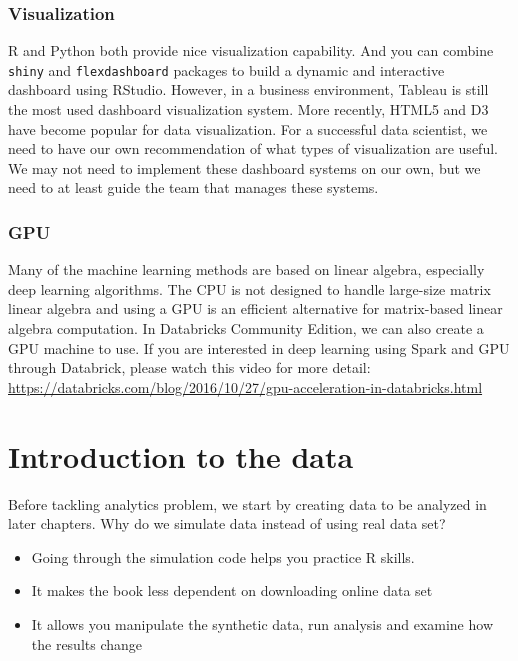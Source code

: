 \documentclass[
]{article}
\providecommand{\tightlist}{%
  \setlength{\itemsep}{0pt}\setlength{\parskip}{0pt}}
\begin{document}
\hypertarget{visualization}{%
\subsubsection{Visualization}\label{visualization}}

R and Python both provide nice visualization capability. And you can
combine \texttt{shiny} and \texttt{flexdashboard} packages to build a
dynamic and interactive dashboard using RStudio. However, in a business
environment, Tableau is still the most used dashboard visualization
system. More recently, HTML5 and D3 have become popular for data
visualization. For a successful data scientist, we need to have our own
recommendation of what types of visualization are useful. We may not
need to implement these dashboard systems on our own, but we need to at
least guide the team that manages these systems.

\hypertarget{gpu}{%
\subsubsection{GPU}\label{gpu}}

Many of the machine learning methods are based on linear algebra,
especially deep learning algorithms. The CPU is not designed to handle
large-size matrix linear algebra and using a GPU is an efficient
alternative for matrix-based linear algebra computation. In Databricks
Community Edition, we can also create a GPU machine to use. If you are
interested in deep learning using Spark and GPU through Databrick,
please watch this video for more detail:
\url{https://databricks.com/blog/2016/10/27/gpu-acceleration-in-databricks.html}

\hypertarget{introduction-to-the-data}{%
\section{Introduction to the data}\label{introduction-to-the-data}}

Before tackling analytics problem, we start by creating data to be
analyzed in later chapters. Why do we simulate data instead of using
real data set?

\begin{itemize}
\tightlist
\item
  Going through the simulation code helps you practice R skills.
\item
  It makes the book less dependent on downloading online data set
\item
  It allows you manipulate the synthetic data, run analysis and examine
  how the results change
\end{itemize}
\end{document}
